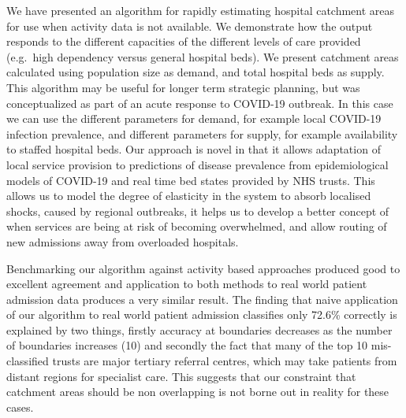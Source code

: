 \documentclass[
]{article}
\begin{document}
We have presented an algorithm for rapidly estimating hospital catchment
areas for use when activity data is not available. We demonstrate how
the output responds to the different capacities of the different levels
of care provided (e.g.~high dependency versus general hospital beds). We
present catchment areas calculated using population size as demand, and
total hospital beds as supply. This algorithm may be useful for longer
term strategic planning, but was conceptualized as part of an acute
response to COVID-19 outbreak. In this case we can use the different
parameters for demand, for example local COVID-19 infection prevalence,
and different parameters for supply, for example availability to staffed
hospital beds. Our approach is novel in that it allows adaptation of
local service provision to predictions of disease prevalence from
epidemiological models of COVID-19 and real time bed states provided by
NHS trusts. This allows us to model the degree of elasticity in the
system to absorb localised shocks, caused by regional outbreaks, it
helps us to develop a better concept of when services are being at risk
of becoming overwhelmed, and allow routing of new admissions away from
overloaded hospitals.

Benchmarking our algorithm against activity based approaches produced
good to excellent agreement and application to both methods to real
world patient admission data produces a very similar result. The finding
that naive application of our algorithm to real world patient admission
classifies only 72.6\% correctly is explained by two things, firstly
accuracy at boundaries decreases as the number of boundaries increases
(10) and secondly the fact that many of the top 10 mis-classified trusts
are major tertiary referral centres, which may take patients from
distant regions for specialist care. This suggests that our constraint
that catchment areas should be non overlapping is not borne out in
reality for these cases.
\end{document}
